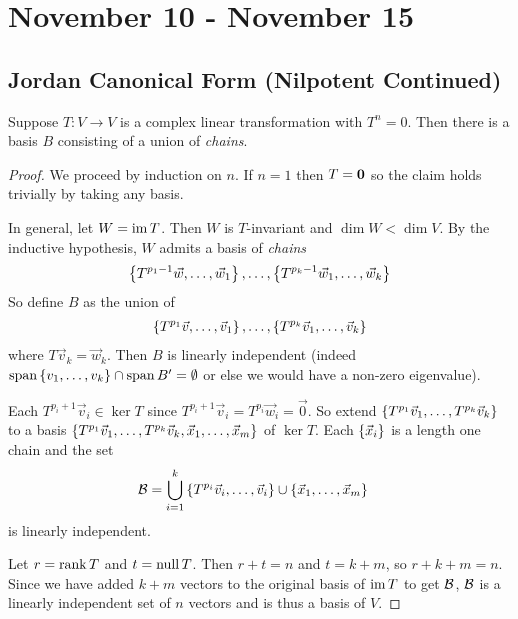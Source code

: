\chapter{November 10 - November 15}

\section{Jordan Canonical Form (Nilpotent Continued)}

\begin{theorem}
  Suppose $T : V \to V$ is a complex linear transformation with $T^n = 0$.
  Then there is a basis $B$ consisting of a union of \emph{chains}.
\end{theorem}
\begin{proof}
  We proceed by induction on $n$. If $n=1$ then $T = {\bf 0}$ so the claim holds trivially by taking any basis.

  In general, let $W = \operatorname{im} T$. Then $W$ is $T$-invariant and $\dim W < \dim V$.
  By the inductive hypothesis, $W$ admits a basis of \emph{chains}
  \begin{align}
    \left\{T^{p_1-1}\vec w,\ldots,\vec w_1\right\}, \ldots, \left\{T^{p_k-1}\vec w_1,\ldots,\vec w_k\right\}
  \end{align}
  So define $B$ as the union of
  \begin{align}
    \left\{T^{p_1}\vec v,\ldots,\vec v_1\right\}, \ldots, \left\{T^{p_k}\vec v_1,\ldots,\vec v_k\right\}
  \end{align}
  where $T\vec v_k = \vec w_k$. Then $B$ is linearly independent (indeed $\text{span}\left\{v_1,\ldots,v_k\right\} \cap \operatorname{span} B' = \emptyset$ or else we would have a non-zero eigenvalue).

  Each $T^{p_i+1}\vec v_i \in \ker T$ since $T^{p_i+1}\vec v_i = T^{p_i} \vec w_i = \vec 0$.
  So extend $\left\{ T^{p_1}\vec v_1, \ldots, T^{p_k}\vec v_k \right\}$ to a basis $\left\{ T^{p_1}\vec v_1, \ldots, T^{p_k}\vec v_k, \vec x_1, \ldots, \vec x_m \right\}$ of $\ker T$.
  Each $\left\{ \vec x_i \right\}$ is a length one chain and the set
    \begin{align}
      \mathcal{B} &= \bigcup_{i=1}^k\left\{T^{p_i}\vec v_i, \ldots, \vec v_i\right\} \cup \left\{ \vec x_1, \ldots, \vec x_m \right\}
    \end{align}
  is linearly independent.

  Let $r = \operatorname{rank} T$ and $t = \operatorname{null} T$. Then $r + t = n$ and $t = k + m$, so $r + k + m = n$.
  Since we have added $k + m$ vectors to the original basis of $\operatorname{im} T$ to get $\mathcal{B}$, $\mathcal{B}$
  is a linearly independent set of $n$ vectors and is thus a basis of $V$.
\end{proof}

